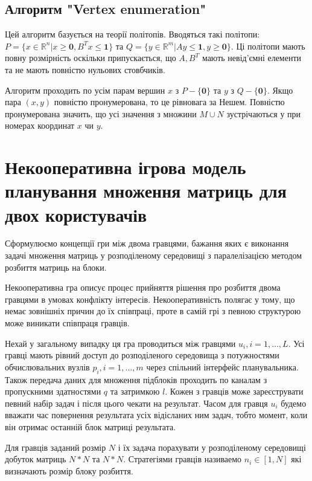 \subsection{Алгоритм "Vertex enumeration"}

Цей алгоритм базується на теорії політопів. Вводяться такі політопи: $P=\{x \in \mathbb{R}^n | x \ge \textbf{0}, B^Tx \le \textbf{1} \}$ та $Q=\{y \in \mathbb{R}^m | Ay \le \textbf{1}, y \ge \textbf{0} \}$. Ці політопи мають повну розмірність оскільки  припускається, що $A,B^T$ мають невід'ємні елементи та не мають повністю нульових стовбчиків.

Алгоритм проходить по усім парам вершин $x$ з $P-\{\textbf{0}\}$ та $y$ з $Q-\{\textbf{0}\}$. Якщо пара $(x,y)$ повністю пронумерована, то це рівновага за Нешем. Повністю пронумерована значить, що усі значення з множини $M \cup N$ зустрічаються у при номерах координат $x$ чи $y$.

\section{Некооперативна ігрова модель планування множення матриць для двох користувачів}

Сформулюємо концепції гри між двома гравцями, бажання яких є виконання задачі множення матриць у розподіленому середовищі з паралелізацією методом розбиття матриць на блоки. 

Некооперативна гра описує процес прийняття рішення про розбиття двома гравцями в умовах конфлікту інтересів. Некооперативність полягає у тому, що немає зовнішніх причин до їх співпраці, проте в самій грі з певною структурою може виникати співпраця гравців.

Нехай у загальному випадку ця гра проводиться між гравцями ${u_i}, i=1,\ldots,L$. Усі гравці мають рівний доступ до розподіленого середовища з потужностями обчислювальних вузлів ${p_i}, i=1,\ldots,m$ через спільний інтерфейс планувальника. Також передача даних для множення підблоків проходить по каналам з пропускними здатностями $q$ та затримкою $l$. Кожен з гравців може зареєструвати певний набір задач і після цього чекати на результат. Часом для гравця $u_i$ будемо вважати час повернення результата усіх відісланих ним задач, тобто момент, коли він отримає останній блок матриці результата.

Для гравців заданий розмір $N$ і їх задача порахувати у розподіленому середовищі добуток матриць $N*N$ та $N*N$. Стратегіями гравців називаемо $n_i \in [1,N]$ які визначають розмір блоку розбиття.

